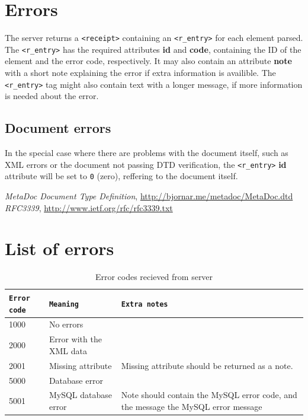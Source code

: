 \documentclass[titlepage, a4paper,10pt]{article}
\begin{document}
\newpage
\section{Errors}
\label{sec:errors}

The server returns a \texttt{<receipt>} containing an \texttt{<r\_entry>} for 
each element parsed. The \texttt{<r\_entry>} has the required attributes 
\textbf{id} and \textbf{code}, containing the ID of the element and the error 
code, respectively. It may also contain an attribute \textbf{note} with a short 
note explaining the error if extra information is availible. The 
\texttt{<r\_entry>} tag might also contain text with a longer message, if more 
information is needed about the error. 

\subsection{Document errors}

In the special case where there are problems with the document itself, such as 
XML errors or the document not passing DTD verification, the \texttt{<r\_entry>} 
\textbf{id} attribute will be set to \texttt{0} (zero), reffering to the 
document itself. 


\newpage
\begin{thebibliography}{99}
     \textit{MetaDoc Document Type Definition}, 
        \url{http://bjornar.me/metadoc/MetaDoc.dtd}
     \textit{RFC3339}, \url{http://www.ietf.org/rfc/rfc3339.txt}
\end{thebibliography}

\appendix

\newpage
\section{List of errors}

\begin{table}[h]
    \caption{Error codes recieved from server}
    \begin{tabular}{|l|l|p{5cm}|}
        \hline
        \texttt{Error code} & \texttt{Meaning} & \texttt{Extra notes} \\
        \hline
        \hline
        1000 & No errors & \\
        \hline
        \hline
        2000 & Error with the XML data & \\
        \hline
        2001 & Missing attribute & Missing attribute should be returned as a note. \\
        \hline
        \hline
        5000 & Database error & \\
        \hline
        5001 & MySQL database error & Note should contain the MySQL error code, and the message the MySQL error message \\
        \hline
    \end{tabular}
    \label{tbl:server_error_codes}
\end{table}
\end{document}
